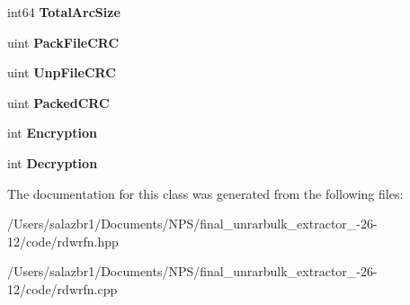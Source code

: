 \begin{DoxyCompactItemize}
\item 
\hypertarget{class_compr_data_i_o_a4714f96bf752047b51301ee8f03e9cca}{int64 {\bfseries Total\-Arc\-Size}}\label{class_compr_data_i_o_a4714f96bf752047b51301ee8f03e9cca}

\item 
\hypertarget{class_compr_data_i_o_aeb8b7ef01b466bbad70daf8ca86d864d}{uint {\bfseries Pack\-File\-C\-R\-C}}\label{class_compr_data_i_o_aeb8b7ef01b466bbad70daf8ca86d864d}

\item 
\hypertarget{class_compr_data_i_o_a44e7244fee333a0f1b03a4349b2189e0}{uint {\bfseries Unp\-File\-C\-R\-C}}\label{class_compr_data_i_o_a44e7244fee333a0f1b03a4349b2189e0}

\item 
\hypertarget{class_compr_data_i_o_a0b17289dab91eb5a33d40fae0b9ec325}{uint {\bfseries Packed\-C\-R\-C}}\label{class_compr_data_i_o_a0b17289dab91eb5a33d40fae0b9ec325}

\item 
\hypertarget{class_compr_data_i_o_a5fd109bfd8c6b25b54a9752a6976d1cf}{int {\bfseries Encryption}}\label{class_compr_data_i_o_a5fd109bfd8c6b25b54a9752a6976d1cf}

\item 
\hypertarget{class_compr_data_i_o_a681245c58c7f46d56575f63e0d994492}{int {\bfseries Decryption}}\label{class_compr_data_i_o_a681245c58c7f46d56575f63e0d994492}

\end{DoxyCompactItemize}


The documentation for this class was generated from the following files\-:\begin{DoxyCompactItemize}
\item 
/\-Users/salazbr1/\-Documents/\-N\-P\-S/final\-\_\-unrarbulk\-\_\-extractor\-\_-\/26-\/12/code/rdwrfn.\-hpp\item 
/\-Users/salazbr1/\-Documents/\-N\-P\-S/final\-\_\-unrarbulk\-\_\-extractor\-\_-\/26-\/12/code/rdwrfn.\-cpp\end{DoxyCompactItemize}
